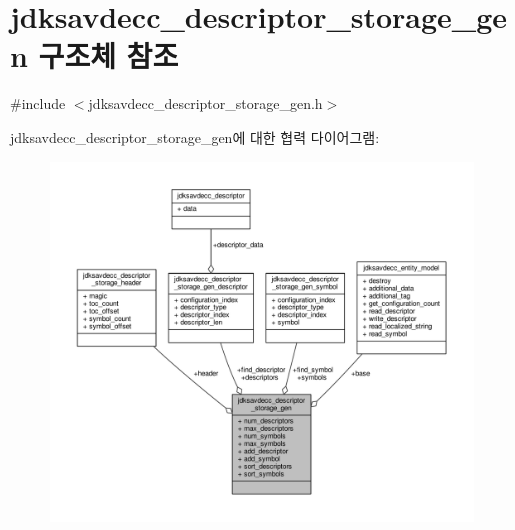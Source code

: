 \hypertarget{structjdksavdecc__descriptor__storage__gen}{}\section{jdksavdecc\+\_\+descriptor\+\_\+storage\+\_\+gen 구조체 참조}
\label{structjdksavdecc__descriptor__storage__gen}


{\ttfamily \#include $<$jdksavdecc\+\_\+descriptor\+\_\+storage\+\_\+gen.\+h$>$}



jdksavdecc\+\_\+descriptor\+\_\+storage\+\_\+gen에 대한 협력 다이어그램\+:
\nopagebreak
\begin{figure}[H]
\begin{center}
\leavevmode
\includegraphics[width=350pt]{structjdksavdecc__descriptor__storage__gen__coll__graph}
\end{center}
\end{figure}
